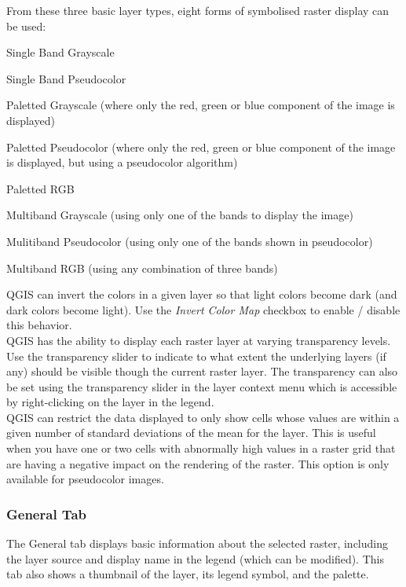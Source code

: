 From these three basic layer types, eight forms of symbolised raster display can
be used:
\begin{compactenum}

\item Single Band Grayscale
\item Single Band Pseudocolor
\item Paletted Grayscale (where only the red, green or blue component of the image is displayed)
\item Paletted Pseudocolor (where only the red, green or blue component of the image is displayed, but using a pseudocolor algorithm)
\item Paletted RGB
\item Multiband Grayscale (using only one of the bands to display the image)
\item Mulitiband Pseudocolor (using only one of the bands shown in pseudocolor)
\item Multiband RGB (using any combination of three bands)
\end{compactenum}
\smallskip
QGIS can invert the colors in a given layer so that light colors become dark
(and dark colors become light). Use the \textsl{Invert Color Map} checkbox to
enable / disable this behavior.\\

QGIS has the ability to display each raster layer at varying transparency
levels. Use the transparency slider to indicate to what extent the underlying layers (if any) should be visible though the current raster layer. The transparency can also be set using the transparency slider in the layer context menu which is accessible by right-clicking on the layer in the legend.\\

QGIS can restrict the data displayed to only show cells whose values are within
a given number of standard deviations of the mean for the
layer. This is useful when you have one or two cells with abnormally high values in a raster grid that are having a negative impact on the rendering of the raster. This option is only available for pseudocolor images.\\

\subsubsection{General Tab}
The General tab displays basic information about the selected raster, including
the layer source and  display name in the legend (which can be modified). This
tab also shows a thumbnail of the layer, its legend symbol, and the
palette.

